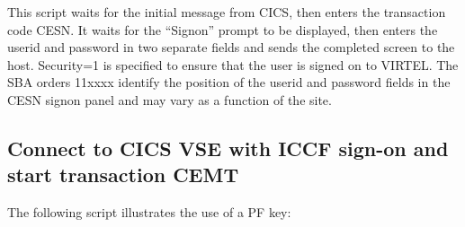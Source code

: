 \documentclass[letterpaper,10pt,english]{sphinxmanual}
\begin{document}

This script waits for the initial message from CICS, then enters the transaction code CESN. It waits for the “Signon” prompt to be displayed, then enters the userid and password in two separate fields and sends the completed screen to the host. Security=1 is specified to ensure that the user is signed on to VIRTEL. The SBA orders 11xxxx identify the position of the userid and password fields in the CESN signon panel and may vary as a function of the site.

\ignorespaces 

\subsection{Connect to CICS VSE with ICCF sign-on and start transaction CEMT}
\label{\detokenize{connectivity_guide:connect-to-cics-vse-with-iccf-sign-on-and-start-transaction-cemt}}\label{\detokenize{connectivity_guide:index-125}}
The following script illustrates the use of a PF key:
\end{document}
